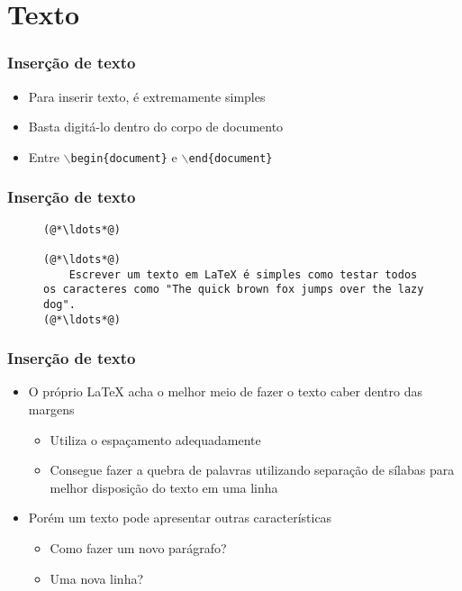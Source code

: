 \section{Texto}

\begin{frame}[fragile] \frametitle{Inserção de texto}
\begin{itemize}
	\item Para inserir texto, é extremamente simples
	\item Basta digitá-lo dentro do corpo de documento
	\item Entre \texttt{$\backslash$begin\{document\}} e \texttt{$\backslash$end\{document\}}
\end{itemize}
\end{frame}

\begin{frame}[fragile] \frametitle{Inserção de texto}
\begin{figure}[!t]
\begin{lstlisting}
(@*\ldots*@)

(@*\ldots*@)
	Escrever um texto em LaTeX é simples como testar todos os caracteres como "The quick brown fox jumps over the lazy dog".
(@*\ldots*@)

\end{lstlisting}
\end{figure}
\end{frame}

\begin{frame}[fragile] \frametitle{Inserção de texto}
\begin{itemize}
	\item O próprio LaTeX acha o melhor meio de fazer o texto caber dentro das margens
	\begin{itemize}
		\item Utiliza o espaçamento adequadamente
		\item Consegue fazer a quebra de palavras utilizando separação de sílabas para melhor disposição do texto em uma linha
	\end{itemize}
	\item Porém um texto pode apresentar outras características
	\begin{itemize}
		\item Como fazer um novo parágrafo?
		\item Uma nova linha?
	\end{itemize}
\end{itemize}
\end{frame}

